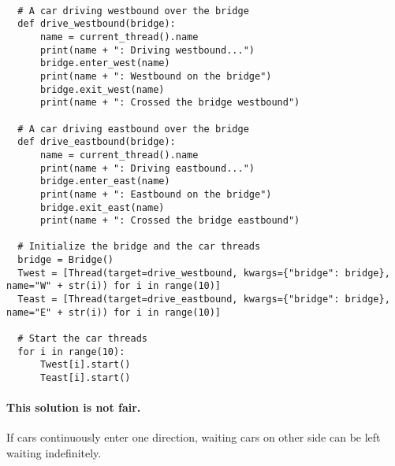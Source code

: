 \documentclass{article}
\begin{document}
\begin{lstlisting}
          
  # A car driving westbound over the bridge
  def drive_westbound(bridge):
      name = current_thread().name
      print(name + ": Driving westbound...")
      bridge.enter_west(name)
      print(name + ": Westbound on the bridge")
      bridge.exit_west(name)
      print(name + ": Crossed the bridge westbound")
  
  # A car driving eastbound over the bridge
  def drive_eastbound(bridge):
      name = current_thread().name
      print(name + ": Driving eastbound...")
      bridge.enter_east(name)
      print(name + ": Eastbound on the bridge")
      bridge.exit_east(name)
      print(name + ": Crossed the bridge eastbound")
  
  # Initialize the bridge and the car threads
  bridge = Bridge()
  Twest = [Thread(target=drive_westbound, kwargs={"bridge": bridge}, name="W" + str(i)) for i in range(10)]
  Teast = [Thread(target=drive_eastbound, kwargs={"bridge": bridge}, name="E" + str(i)) for i in range(10)]
  
  # Start the car threads
  for i in range(10):
      Twest[i].start()
      Teast[i].start()
  \end{lstlisting}

\paragraph{This solution is not fair.}If cars continuously enter
one direction, waiting cars on other side can be left waiting indefinitely.


\newpage
\printbibliography
\end{document}
